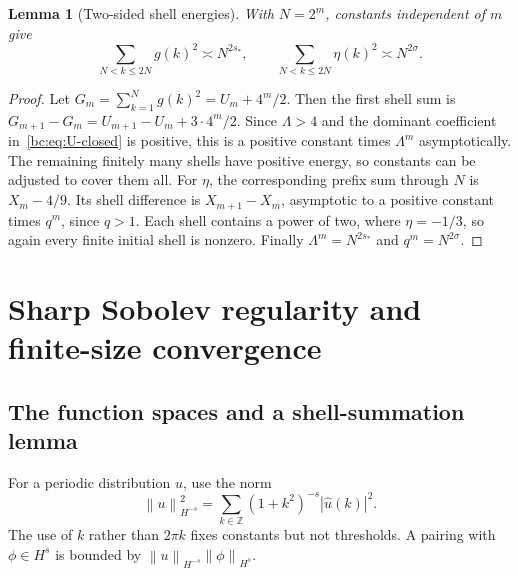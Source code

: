 \documentclass[11pt,a4paper,oneside,openany]{book}
\numberwithin{equation}{chapter}
\newtheorem{lemma}[theorem]{Lemma}
\theoremstyle{definition}
\theoremstyle{remark}
\newcommand{\Z}{\mathbb Z}
\newcommand{\norm}[1]{\left\lVert #1\right\rVert}
\begin{document}
\begin{lemma}[Two-sided shell energies]
\label{bc:lem:shell}
With $N=2^m$, constants independent of $m$ give
\begin{equation}
 \sum_{N<k\le2N}g(k)^2\asymp N^{2s_*},\qquad
 \sum_{N<k\le2N}\eta(k)^2\asymp N^{2\sigma}.
 \label{bc:eq:shells}
\end{equation}
\end{lemma}
\begin{proof}
Let $G_m=\sum_{k=1}^Ng(k)^2=U_m+4^m/2$.
Then the first shell sum is
$G_{m+1}-G_m=U_{m+1}-U_m+3\cdot4^m/2$.
Since $\Lambda>4$ and the dominant coefficient in~\eqref{bc:eq:U-closed} is
positive, this is a positive constant times $\Lambda^m$ asymptotically.
The remaining finitely many shells have positive energy, so constants can be
adjusted to cover them all. For $\eta$, the corresponding prefix sum through
$N$ is $X_m-4/9$. Its shell difference is $X_{m+1}-X_m$, asymptotic to a
positive constant times $q^m$, since $q>1$. Each shell contains a power of two,
where $\eta=-1/3$, so again every finite initial shell is nonzero. Finally
$\Lambda^m=N^{2s_*}$ and $q^m=N^{2\sigma}$.
\end{proof}
\chapter{Sharp Sobolev regularity and finite-size convergence}
\label{bc:sec:sobolev}

\section{The function spaces and a shell-summation lemma}
For a periodic distribution $u$, use the norm
\begin{equation}
 \norm{u}_{H^{-s}}^2=
 \sum_{k\in\Z}(1+k^2)^{-s}|\widehat u(k)|^2.
 \label{bc:eq:Sobolev}
\end{equation}
The use of $k$ rather than $2\pi k$ fixes constants but not thresholds. A pairing
with $\phi\in H^s$ is bounded by $\norm{u}_{H^{-s}}\norm{\phi}_{H^s}$.
\end{document}
